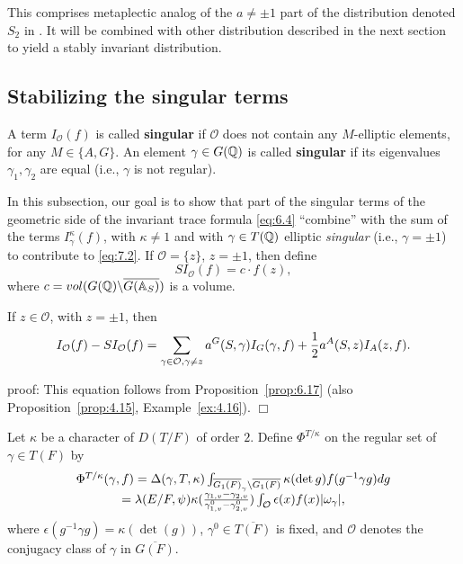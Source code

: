 \begin{remark}\label{rem:7.10} This comprises metaplectic analog of
the $a\not= \pm 1$
part of the distribution denoted $S_2$ in \cite{LL}. It
will be combined with other distribution
described in the next section to yield a stably
invariant distribution.
\end{remark}

\subsection{Stabilizing the singular terms}\label{ssec:singular}

A term $I_{\mathcal{O}}(f)$ is called {\bf singular} if ${\mathcal{O}}$
does not contain any $M$-elliptic elements, for any $M\in \{A,G\}$.
An element $\gamma\in G(\mathbb{Q} )$ is called {\bf singular}
if its eigenvalues $\gamma_1,\gamma_2$ are equal (i.e.,
$\gamma$ is not regular).

In this subsection, our goal is to show that part of
the singular terms of the geometric side of the invariant
trace formula \eqref{eq:6.4} ``combine'' with the sum of the terms
$I_\gamma ^\kappa (f)$,
with $\kappa \neq 1$ and with
$\gamma \in T(\mathbb{Q} )$ elliptic \emph{singular}
(i.e., $\gamma =\pm 1$) to contribute to \eqref{eq:7.2}. 
If ${\mathcal O}=\{z\}$, $z=\pm 1$, then define
\begin{equation}\label{eq:7.15}
SI_{\mathcal O}(f)=c\cdot f(z),
\end{equation}
where $c=vol(G({\mathbb Q})\backslash \overline{G(\mathbb{A} _S)})$ is a volume.

\begin{lemma}\label{lem:7.11} If $z\in {\mathcal{O}}$, with $z=\pm 1$, then
\[
I_{\mathcal O}(f)-SI_{\mathcal O}(f)=
\sum_{ \gamma\in {\mathcal{O}}, \gamma\not= z}
a^G(S,\gamma)I_G(\gamma,f)+
{1\over 2}a^A(S,z)I_A(z,f).
\]
\end{lemma}
proof: This equation follows from Proposition~\ref{prop:6.17}
(also Proposition~\ref{prop:4.15}, Example~\ref{ex:4.16}). $\Box$

\begin{definition}\label{defn:7.12}
Let $\kappa$ be a character of
$D(T/F)$ of order $2$.
Define $\Phi^{T/\kappa}$ on the regular set of $\gamma\in T(F)$ by
\[
\begin{array}{c}
\Phi^{T/\kappa}(\gamma,f)=
\Delta(\gamma,T,\kappa)
\int_{\overline{G_1(F)}_\gamma\backslash \overline{G_1(F)}}
\kappa(\det{g})f(g^{-1}\gamma g)dg\\
=
\lambda(E/F,\psi)
\kappa({\gamma_{1,v}-\gamma_{2,v}\over \gamma_{1,v}^0-\gamma_{2,v}^0})
\int_{\mathcal{O}}\epsilon(x)f(x)|\omega_\gamma|,
\end{array}
\]
where $\epsilon(g^{-1}\gamma g)=\kappa(\det(g))$,
$\gamma^0\in \overline{T(F)}$
is fixed, and $\mathcal{O}$ denotes the conjugacy class of
$\gamma$ in $\overline{G(F)}$.
\end{definition}

